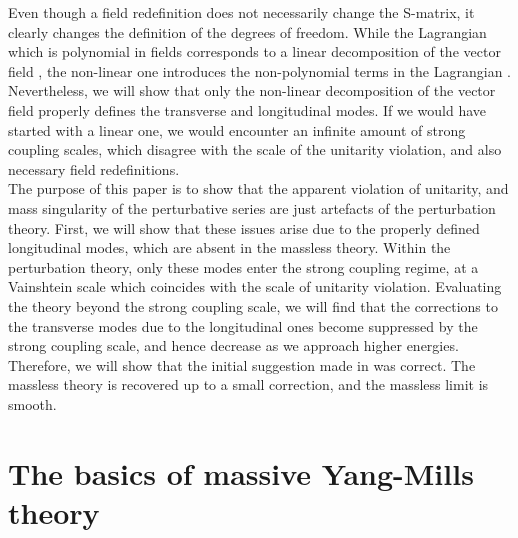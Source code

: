 \documentclass{article}
\begin{document}
Even though a field redefinition does not necessarily change the S-matrix, it clearly changes the definition of the degrees of freedom. While the Lagrangian which is polynomial in fields corresponds to a linear decomposition of the vector field \cite{SalamKomar, UmezawaKamefuchi, Ionides, Salam}, the non-linear one introduces the non-polynomial terms in the Lagrangian \cite{Kunimasa}. 
Nevertheless, we will show that only the non-linear decomposition of the vector field properly defines the transverse and longitudinal modes. If we would have started with a linear one, we would encounter an infinite amount of strong coupling scales, which disagree with the scale of the unitarity violation, and also necessary field redefinitions.  
\\
The purpose of this paper is to show that the apparent violation of unitarity, and mass singularity of the perturbative series are just artefacts of the perturbation theory. First, we will show that these issues arise due to the properly defined longitudinal modes, which are absent in the massless theory. Within the perturbation theory, only these modes enter the strong coupling regime, at a Vainshtein scale which coincides with the scale of unitarity violation. Evaluating the theory beyond the strong coupling scale, we will find that the corrections to the transverse modes due to the longitudinal ones become suppressed by the strong coupling scale, and hence decrease as we approach higher energies. Therefore, we will show that the initial suggestion made in \cite{Vainshtein} was correct. The massless theory is recovered up to a small correction, and the massless limit is smooth. 




\section{The basics of massive Yang-Mills theory}
\end{document}
